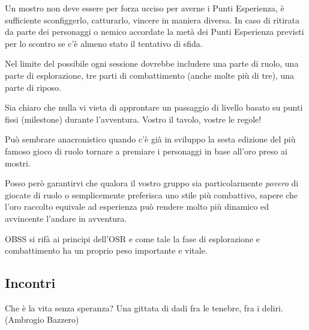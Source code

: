 \begin{multicols}{2}
Un mostro non deve essere per forza ucciso per averne i Punti Esperienza, è sufficiente sconfiggerlo, catturarlo, vincere in maniera diversa. In caso di ritirata da parte dei personaggi o nemico accordate la metà dei Punti Esperienza previsti per lo scontro se c'è almeno stato il tentativo di sfida.

Nel limite del possibile ogni sessione dovrebbe includere una parte di ruolo, una parte di esplorazione, tre parti di combattimento (anche molte più di tre), una parte di riposo.

\medskip

\begin{changemargin}{0.3cm}{0.3cm}\begin{narratore}
Sia chiaro che nulla vi vieta di approntare un passaggio di livello basato su punti fissi (milestone) durante l'avventura. Vostro il tavolo, vostre le regole!
\end{narratore}\end{changemargin}

\medskip

\begin{changemargin}{0.3cm}{0.3cm}\begin{narratore}
Può sembrare anacronistico quando c'è già in sviluppo la sesta edizione del più famoso gioco di ruolo tornare a premiare i personaggi in base all'oro preso ai mostri.

Posso però garantirvi che qualora il vostro gruppo sia particolarmente \emph{povero} di giocate di ruolo o semplicemente preferisca uno stile più combattivo, sapere che l'oro raccolto equivale ad esperienza può rendere molto più dinamico ed avvincente l'andare in avventura.

OBSS si rifà ai principi dell'OSR e come tale la fase di esplorazione e combattimento ha un proprio peso importante e vitale.
\end{narratore}\end{changemargin}

\subsection{Incontri}

\label{incontri}

\begin{changemargin}{0.3cm}{0.3cm}\begin{enfasi}{Che è la vita senza speranza? Una gittata di dadi fra le tenebre, fra i deliri. (Ambrogio Bazzero)}
\end{enfasi}\end{changemargin}


\end{multicols}
